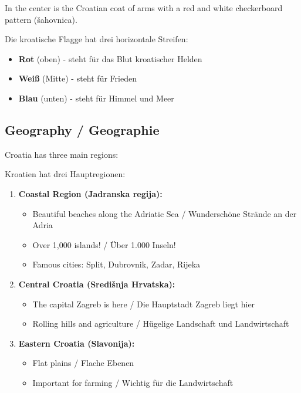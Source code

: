 \begin{culture}
In the center is the Croatian coat of arms with a red and white checkerboard pattern (šahovnica).

Die kroatische Flagge hat drei horizontale Streifen:
\begin{itemize}
    \item \textcolor{croatianred}{\textbf{Rot}} (oben) - steht für das Blut kroatischer Helden
    \item \textbf{Weiß} (Mitte) - steht für Frieden
    \item \textcolor{croatianblue}{\textbf{Blau}} (unten) - steht für Himmel und Meer
\end{itemize}

\subsection*{Geography / Geographie}

Croatia has three main regions:

Kroatien hat drei Hauptregionen:

\begin{enumerate}
    \item \textbf{Coastal Region (Jadranska regija):} 
    \begin{itemize}
        \item Beautiful beaches along the Adriatic Sea / Wunderschöne Strände an der Adria
        \item Over 1,000 islands! / Über 1.000 Inseln!
        \item Famous cities: Split, Dubrovnik, Zadar, Rijeka
    \end{itemize}
    
    \item \textbf{Central Croatia (Središnja Hrvatska):}
    \begin{itemize}
        \item The capital Zagreb is here / Die Hauptstadt Zagreb liegt hier
        \item Rolling hills and agriculture / Hügelige Landschaft und Landwirtschaft
    \end{itemize}
    
    \item \textbf{Eastern Croatia (Slavonija):}
    \begin{itemize}
        \item Flat plains / Flache Ebenen
        \item Important for farming / Wichtig für die Landwirtschaft
    \end{itemize}
\end{enumerate}


\end{culture}
